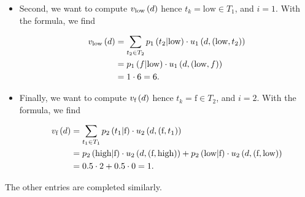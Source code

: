 \begin{enumerate}[label=\alph*.]
\begin{itemize}
     \item Second, we want to compute $v_{\text{low}} \left(d\right)$ hence $t_{k} = \text{low} \in T_1$, and $i = 1$. With the formula, we find
     
     \begin{align*}
         v_{\text{low}} \left(d\right)
        & = \sum_{t_{2} \in T_{2}} p_{1} \left(t_{2}|\text{low}\right) \cdot u_{1} \left(d, (\text{low}, t_{2})\right) \\
        & = p_{1} \left(f|\text{low}\right) \cdot u_{1} \left(d, (\text{low}, f)\right) \\
        & = 1 \cdot 6 = 6.
     \end{align*}
     
     \item Finally, we want to compute $v_{\text{f}} \left(d\right)$ hence $t_{k} = \text{f} \in T_2$, and $i = 2$. With the formula, we find
     
     \begin{align*}
         v_{\text{f}} \left(d\right)
        & = \sum_{t_{1} \in T_{1}} p_2 \left(t_{1}|\text{f}\right) \cdot u_{2} \left(d, (\text{f}, t_{1})\right) \\
        & = p_2 \left(\text{high}|\text{f}\right) \cdot u_{2} \left(d, (\text{f}, \text{high})\right)
        + p_2 \left(\text{low}|\text{f}\right) \cdot u_{2} \left(d, (\text{f}, \text{low})\right) \\
        & = 0.5 \cdot 2 + 0.5 \cdot 0 = 1.
     \end{align*}
\end{itemize}

The other entries are completed similarly. 


\end{enumerate}
